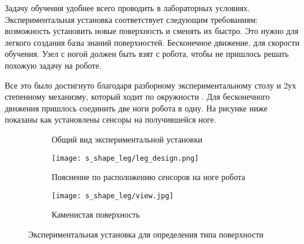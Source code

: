 Задачу обучения удобнее всего проводить в лабораторных условиях. Экспериментальная установка соответствует следующим требованиям: возможность установить новые поверхность и сменять их быстро. Это нужно для легкого создания базы знаний поверхностей. Бесконечное движение, для скорости обучения. Узел с ногой должен быть взят с робота, чтобы не пришлось решать похожую задачу на роботе.

Все это было достигнуто благодаря разборному экспериментальному столу и 2ух степенному механизму, который ходит по окружности . Для бесконечного движения пришлось соединить две ноги робота в одну. На рисунке ниже  показаны как установлены сенсоры на получившейся ноге.

\begin{figure}[H]
    \begin{subfigure}[t]{0.48\textwidth}
        \centering
        \caption{Общий вид экспериментальной установки}
        \label{fig:s_shape_leg/s_leg_setup.JPG}
    \end{subfigure}
    \begin{subfigure}[t]{0.24\textwidth}
        \centering\texttt{[image: s\_shape\_leg/leg\_design.png]}
        \caption{Пояснение по расположению сенсоров на ноге робота}
        \label{fig:s_shape_leg/leg_design.png}
    \end{subfigure}
    \begin{subfigure}[t]{0.24\textwidth}
        \centering\texttt{[image: s\_shape\_leg/view.jpg]}
        \caption{Каменистая поверхность}
        \label{fig:s_shape_leg/view.jpg}
    \end{subfigure}
    \caption{Экспериментальная установка для определения типа поверхности}
\end{figure}

